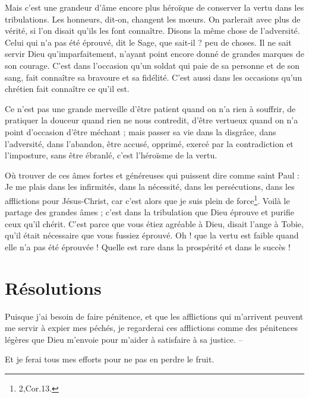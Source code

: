 \documentclass[instructions.tex]{subfiles}
\begin{document}
Mais c'est une grandeur d'âme encore plus héroïque de conserver la vertu dans les tribulations. Les honneurs, dit-on, changent les mœurs. On parlerait avec plus de vérité, si l'on disait qu'ils les font connaître. Disons la même chose de l'adversité. Celui qui n'a pas été éprouvé, dit le Sage, que sait-il ? peu de choses. Il ne sait servir Dieu qu'imparfaitement, n'ayant point encore donné de grandes marques de son courage. C'est dans l'occasion qu'un soldat qui paie de sa personne et de son sang, fait connaître sa bravoure et sa fidélité. C'est aussi dans les occasions qu'un chrétien fait connaître ce qu'il est.
 
Ce n'est pas une grande merveille d'être patient quand on n'a rien à souffrir, de pratiquer la douceur quand rien ne nous contredit, d'être vertueux quand on n'a point d'occasion d'être méchant ; mais passer sa vie dans la disgrâce, dans l'adversité, dans l'abandon, être accusé, opprimé, exercé par la contradiction et l'imposture, sans être ébranlé, c'est l'héroïsme de la vertu.
 
Où trouver de ces âmes fortes et généreuses qui puissent dire comme saint Paul : Je me plais dans les infirmités, dans la nécessité, dans les persécutions, dans les afflictions pour Jésus-Christ, car c'est alors que je suis plein de force\footnote{2,Cor.13.}. Voilà le partage des grandes âmes ; c'est dans la tribulation que Dieu éprouve et purifie ceux qu'il chérit. C'est parce que vous étiez agréable à Dieu, disait l'ange à Tobie, qu'il était nécessaire que vous fussiez éprouvé. Oh ! que la vertu est faible quand elle n'a pas été éprouvée ! Quelle est rare dans la prospérité et dans le succès !
 
\section{Résolutions}
 
\primo Puisque j'ai besoin de faire pénitence, et que les afflictions qui m'arrivent peuvent me servir à expier mes péchés, je regarderai ces afflictions comme des pénitences légères que Dieu m'envoie pour m'aider à satisfaire à sa justice. --

\secundo Et je ferai tous mes efforts pour ne pas en perdre le fruit. 


 
\end{document}
